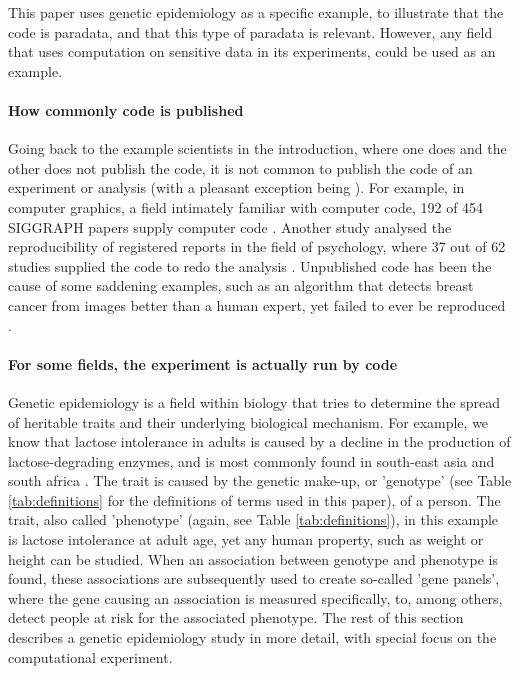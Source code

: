 This paper uses genetic epidemiology as a specific example,
to illustrate that the code is paradata,
and that this type of paradata is relevant.
However, any field that uses computation 
on sensitive data in its experiments,
could be used as an example.

\paragraph{How commonly code is published}\label{para:how-commonly-code-is-published}

Going back to the example scientists in the introduction,
where one does and the other does not publish the code,
it is not common to publish the code of an experiment or analysis 
\cite{stodden2011trust,read2015sizing} (with a pleasant exception 
being \cite{conesa2019making}).
For example, in computer graphics, 
a field intimately familiar with computer code,
192 of 454 SIGGRAPH papers supply computer code \cite{bonneel2020code}.
Another study analysed the reproducibility of registered reports
in the field of psychology, 
where 37 out of 62 studies supplied the code 
to redo the analysis \cite{obels2020analysis}.
Unpublished code has been the cause of some saddening examples,
such as an algorithm that detects breast cancer from images 
better than a human expert, 
yet failed to ever be reproduced \cite{haibe2020importance}.

\paragraph{For some fields, the experiment is actually run by code}

Genetic epidemiology is a field within biology that
tries to determine the spread of heritable traits 
and their underlying biological mechanism.
For example, we know that lactose intolerance in adults is
caused by a decline in the production of lactose-degrading enzymes,
and is most commonly found in south-east asia and south africa \cite{storhaug2017country}.
The trait is caused by the genetic make-up, or 'genotype'
(see Table \ref{tab:definitions} for the definitions of terms used in this paper), 
of a person.
The trait, also called 'phenotype' (again, see Table \ref{tab:definitions}), 
in this example is lactose intolerance at adult age,
yet any human property, such as weight or height can be studied.
When an association between genotype and phenotype is found,
these associations are subsequently used to 
create so-called 'gene panels', 
where the gene causing 
an association is measured specifically, to, among others,
detect people at risk for the associated phenotype.
The rest of this section describes a genetic epidemiology study 
in more detail, with special focus on the computational experiment.

